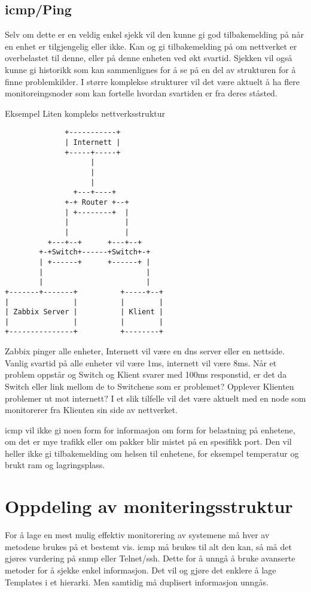 \subsection{\gls{icmp}/Ping}
Selv om dette er en veldig enkel sjekk vil den kunne gi god tilbakemelding på når en enhet er tilgjengelig eller ikke. Kan og gi tilbakemelding på om nettverket er overbelastet til denne, eller på denne enheten ved økt svartid. 
Sjekken vil også kunne gi historikk som kan sammenlignes for å se på en del av strukturen for å finne problemkilder.
I større komplekse strukturer vil det være aktuelt å ha flere monitoreingsnoder som kan fortelle hvordan svartiden er fra deres ståsted. 
\begin{tanke}{Eksempel}
Liten kompleks nettverksstruktur
    \begin{verbatim}
              +-----------+
              | Internett |
              +-----+-----+
                    |
                    |
                    |
                +---+----+
              +-+ Router +--+
              | +--------+  |
              |             |
              |             |
          +---+--+      +---+--+
        +-+Switch+------+Switch+-+
        | +------+      +------+ |
        |                        |
        |                        |
+-------+-------+          +-----+--+
|               |          |        |
| Zabbix Server |          | Klient |
|               |          |        |
+---------------+          +--------+

    \end{verbatim}
    Zabbix pinger alle enheter, Internett vil være en \gls{dns} server eller en nettside. Vanlig svartid på alle enheter vil være 1ms, internett vil være 8ms. Når et problem oppstår og Switch og Klient svarer med 100ms responstid, er det da Switch eller link mellom de to Switchene som er problemet? Opplever Klienten problemer ut mot internett? I et slik tilfelle vil det være aktuelt med en node som monitorerer fra Klienten sin side av nettverket.
\end{tanke}
\gls{icmp} vil ikke gi noen form for informasjon om form for belastning på enhetene, om det er mye trafikk eller om pakker blir mistet på en spesifikk port. Den vil heller ikke gi tilbakemelding om helsen til enhetene, for eksempel temperatur og brukt \gls{ram} og lagringsplass.

\section{Oppdeling av moniteringsstruktur}
For å lage en mest mulig effektiv monitorering av systemene må hver av metodene brukes på et bestemt vis. \gls{icmp} må brukes til alt den kan, så må det gjøres vurdering på \gls{snmp} eller Telnet/\gls{ssh}. 
Dette for å unngå å bruke avanserte metoder for å sjekke enkel informasjon. Det vil og gjøre det enklere å lage Templates i et hierarki. Men samtidig må duplisert informasjon unngås. 



